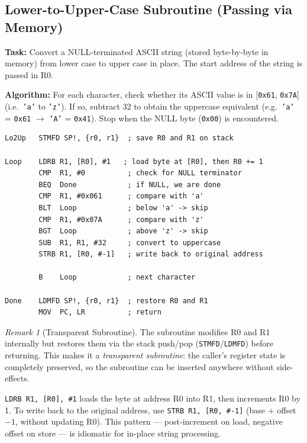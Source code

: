 \documentclass[11pt, a4paper, notitlepage]{report}
\theoremstyle{definition}
\theoremstyle{remark}
\newtheorem{remark}[theorem]{Remark}
\theoremstyle{definition}
\begin{document}
\subsection{Lower-to-Upper-Case Subroutine (Passing via Memory)}

\textbf{Task:} Convert a NULL-terminated ASCII string (stored byte-by-byte in memory) from lower case to upper case in place. The start address of the string is passed in R0.

\textbf{Algorithm:} For each character, check whether its ASCII value is in [\texttt{0x61}, \texttt{0x7A}] (i.e.\ \texttt{'a'} to \texttt{'z'}). If so, subtract 32 to obtain the uppercase equivalent (e.g.\ \texttt{'a'} = \texttt{0x61} $\to$ \texttt{'A'} = \texttt{0x41}). Stop when the NULL byte (\texttt{0x00}) is encountered.

\begin{lstlisting}
Lo2Up   STMFD SP!, {r0, r1}  ; save R0 and R1 on stack

Loop    LDRB R1, [R0], #1   ; load byte at [R0], then R0 += 1
        CMP  R1, #0          ; check for NULL terminator
        BEQ  Done            ; if NULL, we are done
        CMP  R1, #0x061      ; compare with 'a'
        BLT  Loop            ; below 'a' -> skip
        CMP  R1, #0x07A      ; compare with 'z'
        BGT  Loop            ; above 'z' -> skip
        SUB  R1, R1, #32     ; convert to uppercase
        STRB R1, [R0, #-1]   ; write back to original address

        B    Loop            ; next character

Done    LDMFD SP!, {r0, r1}  ; restore R0 and R1
        MOV  PC, LR          ; return
\end{lstlisting}

\begin{remark}[Transparent Subroutine]
\label{rem:transparent}
The subroutine modifies R0 and R1 internally but restores them via the stack push/pop (\texttt{STMFD}/\texttt{LDMFD}) before returning. This makes it a \emph{transparent subroutine}: the caller's register state is completely preserved, so the subroutine can be inserted anywhere without side-effects.
\end{remark}

\begin{examtip}[title={Post-Indexed Addressing with LDRB}]
\texttt{LDRB R1, [R0], \#1} loads the byte at address R0 into R1, then increments R0 by 1. To write back to the original address, use \texttt{STRB R1, [R0, \#-1]} (base + offset $-1$, without updating R0). This pattern --- post-increment on load, negative offset on store --- is idiomatic for in-place string processing.
\end{examtip}
\end{document}
